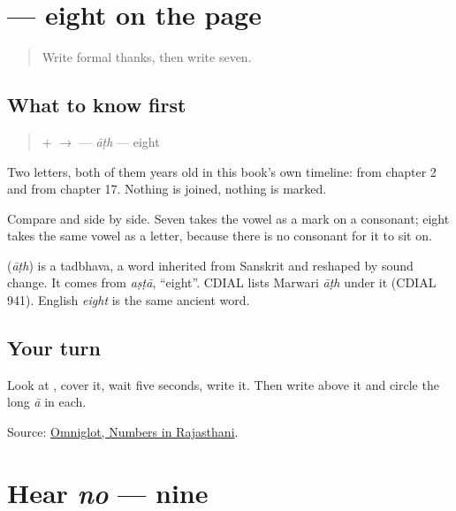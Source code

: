 \section[\texorpdfstring{\mw{आठ} (āṭh)}{आठ (āṭh)}]{ — eight on the page}

\label{lesson:MW-C33-aath}



\begin{quote}
Write formal thanks, then write seven.
\end{quote}

\subsection*{What to know first}
\begin{quote}
\textbf{} + \textbf{} $\to$ \textbf{} — \emph{āṭh} — eight
\end{quote}

Two letters, both of them years old in this book's own timeline: \textbf{} from chapter 2 and \textbf{} from chapter 17. Nothing is joined, nothing is marked.

Compare \textbf{} and \textbf{} side by side. Seven takes the vowel as a mark on a consonant; eight takes the same vowel as a letter, because there is no consonant for it to sit on.

\begin{cousinweb}
\textbf{} (\emph{āṭh}) is a tadbhava, a word inherited from Sanskrit and reshaped by sound change. It comes from \emph{aṣṭā}, \textquotedblleft{}eight\textquotedblright{}. CDIAL lists Marwari \emph{āṭh} under it (CDIAL 941). English \emph{eight} is the same ancient word.
\end{cousinweb}

\subsection*{Your turn}
Look at \textbf{}, cover it, wait five seconds, write it. Then write \textbf{} above it and circle the long \emph{ā} in each.

\begin{tcolorbox}[breakable,colback=teal!4,colframe=teal!35!black,title={Before you move on}]
Source: \href{https://www.omniglot.com/language/numbers/rajasthani.htm}{Omniglot, Numbers in Rajasthani}.
\end{tcolorbox}
\section[no]{Hear \emph{no} — nine}

